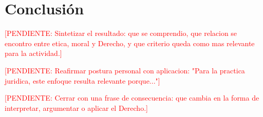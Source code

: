 \documentclass[
	spanish,
	letterpaper, oneside
]{article}
\newcommand{\pendiente}[1]{\textcolor{red}{[PENDIENTE: #1]}}
\begin{document}
\section{Conclusión}

\pendiente{Sintetizar el resultado: que se comprendio, que relacion se encontro entre etica, moral y Derecho, y que criterio queda como mas relevante para la actividad.}

\pendiente{Reafirmar postura personal con aplicacion: "Para la practica juridica, este enfoque resulta relevante porque..."}

\pendiente{Cerrar con una frase de consecuencia: que cambia en la forma de interpretar, argumentar o aplicar el Derecho.}





\end{document}

